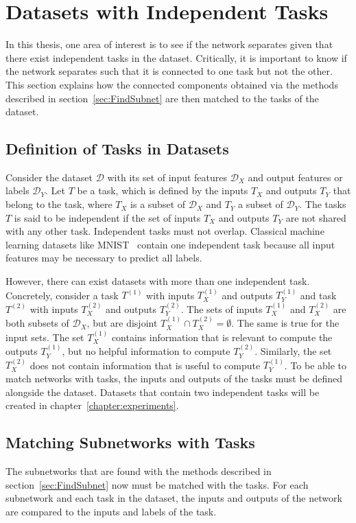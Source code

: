 \section{Datasets with Independent Tasks}\label{sec:taskmatch}
In this thesis, one area of interest is to see if the network separates given that there exist independent tasks in the dataset.
Critically, it is important to know if the network separates such that it is connected to one task but not the other.
This section explains how the connected components obtained via the methods described in section~\ref{sec:FindSubnet} are then matched to the tasks of the dataset.

\subsection{Definition of Tasks in Datasets}
Consider the dataset $\mathcal{D}$ with its set of input features $\mathcal{D}_X$ and output features or labels $\mathcal{D}_Y$.
Let $T$ be a task, which is defined by the inputs $T_X$ and outputs $T_Y$ that belong to the task, where $T_X$ is a subset of $\mathcal{D}_X$ and $T_Y$ a subset of $\mathcal{D}_Y$.
The tasks $T$ is said to be independent if the set of inputs $T_X$ and outputs $T_Y$ are not shared with any other task.
Independent tasks must not overlap.
Classical machine learning datasets like MNIST~\textcite{mnist} contain one independent task because all input features may be necessary to predict all labels.

However, there can exist datasets with more than one independent task.
Concretely, consider a task $T^{(1)}$ with inputs $T^{(1)}_X$ and outputs $T^{(1)}_Y$ and task $T^{(2)}$ with inputs $T^{(2)}_X$ and outputs $T^{(2)}_Y$.
The sets of inputs $T^{(1)}_X$ and $T^{(2)}_X$ are both subsets of $\mathcal{D}_X$, but are disjoint $T^{(1)}_X \cap T^{(2)}_X = \emptyset$.
The same is true for the input sets.
The set $T^{(1)}_X$ contains information that is relevant to compute the outputs $T^{(1)}_Y$, but no helpful information to compute $T^{(2)}_Y$.
Similarly, the set $T^{(2)}_X$ does not contain information that is useful to compute $T^{(1)}_Y$.
To be able to match networks with tasks, the inputs and outputs of the tasks must be defined alongside the dataset.
Datasets that contain two independent tasks will be created in chapter~\ref{chapter:experiments}.

\subsection{Matching Subnetworks with Tasks}
The subnetworks that are found with the methods described in section~\ref{sec:FindSubnet} now must be matched with the tasks.
For each subnetwork and each task in the dataset, the inputs and outputs of the network are compared to the inputs and labels of the task.


